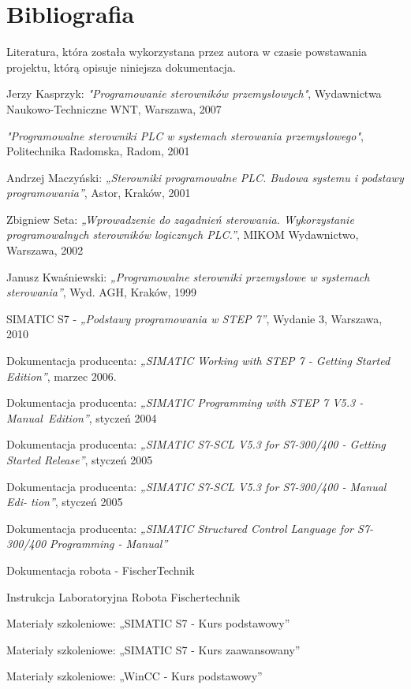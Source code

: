 \section{Bibliografia}
Literatura, która została wykorzystana przez autora w czasie powstawania projektu, którą opisuje niniejsza dokumentacja.

\begin{thebibliography}{99}
{} 
Jerzy Kasprzyk: 
\emph{"Programowanie sterowników przemysłowych"},
Wydawnictwa Naukowo-Techniczne WNT, 
Warszawa, 
2007      

\emph{"Programowalne sterowniki PLC w systemach sterowania przemysłowego"}, 
Politechnika Radomska, 
Radom,
2001

Andrzej Maczyński:
\emph{„Sterowniki programowalne PLC. Budowa systemu i podstawy programowania”},
Astor, 
Kraków,
2001 

Zbigniew Seta: 
\emph{„Wprowadzenie do zagadnień sterowania. Wykorzystanie programowalnych sterowników logicznych PLC.”},
MIKOM Wydawnictwo, 
Warszawa,
2002 

Janusz Kwaśniewski: 
\emph{„Programowalne sterowniki przemysłowe w systemach sterowania”}, 
Wyd. AGH, 
Kraków,
1999

SIMATIC S7 - 
\emph{„Podstawy programowania w STEP 7”}, 
Wydanie 3, 
Warszawa, 
2010

Dokumentacja producenta: 
\emph{„SIMATIC Working with STEP 7 - Getting Started Edition”}, 
marzec 2006.

Dokumentacja producenta:
\emph{„SIMATIC Programming with STEP 7 V5.3 - Manual~Edition”}, 
styczeń 2004

Dokumentacja producenta: 
\emph{„SIMATIC S7-SCL V5.3 for S7-300/400 - Getting Started Release”}, 
styczeń 2005

Dokumentacja producenta: 
\emph{„SIMATIC S7-SCL V5.3 for S7-300/400 - Manual Edi- \hspace*{1mm} tion”}, 
styczeń 2005

Dokumentacja producenta: 
\emph{„SIMATIC Structured Control Language for S7-300/400 \hspace*{0.5mm} Programming - Manual”}

Dokumentacja robota - FischerTechnik

Instrukcja Laboratoryjna Robota Fischertechnik

Materiały szkoleniowe:
„SIMATIC S7 - Kurs podstawowy”

Materiały szkoleniowe:
„SIMATIC S7 - Kurs zaawansowany”

Materiały szkoleniowe:
„WinCC - Kurs podstawowy”

\end{thebibliography}

